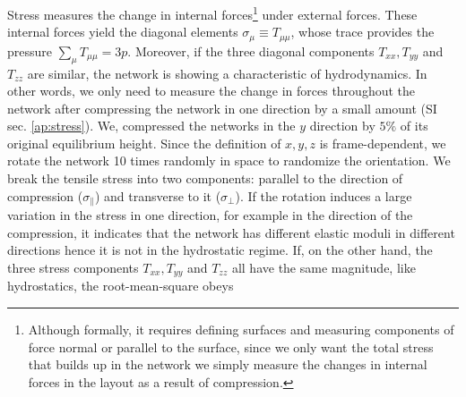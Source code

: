 \documentclass[nofootinbib,preprint,floatfix,titlepage,endfloats]{revtex4} %
\begin{document}
Stress measures the change in internal forces\footnote{Although formally, it requires defining surfaces and measuring components of force normal or parallel to the surface, since we only want the total stress that builds up in the network we simply measure the changes in internal forces in the layout as a result of compression.} under external forces.
These internal forces yield 
the  diagonal elements $ \sigma_\mu \equiv T_{\mu\mu}$, whose trace provides the pressure $\sum_\mu T_{\mu\mu} = 3p$. 
Moreover, if the three diagonal  components $T_{xx}, T_{yy}$ and $T_{zz}$ are similar, the network is showing a characteristic of hydrodynamics.
In other words, we only need to measure the change in forces throughout the network after compressing the network in one direction by a small amount (SI sec. \ref{ap:stress}). 
We, compressed the networks in the $y$ direction by $5\%$ 
of its original equilibrium height. 
Since the definition of $x,y,z$ is frame-dependent, we rotate the network 10 times randomly in space to randomize the orientation. 
We break the tensile stress into two components: parallel to the direction of compression ($\sigma_\parallel$) and transverse to it ($\sigma_\perp$). 
If the rotation induces a large variation in the stress in one direction, for example in the direction of the compression, it indicates that the network has different elastic moduli in different directions hence it is not in the hydrostatic regime. 
If, on the other hand, the three stress components $T_{xx}, T_{yy}$ and $T_{zz}$ all have the same magnitude, like hydrostatics, the root-mean-square obeys
\end{document}
